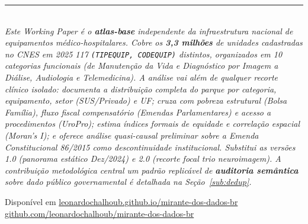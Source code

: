 \documentclass[12pt,a4paper,oneside]{article}
\begin{document}
\begin{titlepage}
\begin{center}
    \rule{0.6\linewidth}{0.4pt}\\[6pt]
    {\small\textit{Este Working Paper é o \textbf{atlas-base}
     independente da infraestrutura nacional de equipamentos
     médico-hospitalares. Cobre os \textbf{3,3 milhões} de unidades
     cadastradas no CNES em 2025
     \textemdash{} 117 \texttt{(TIPEQUIP, CODEQUIP)} distintos,
     organizados em 10 categorias funcionais (de Manutenção da Vida e
     Diagnóstico por Imagem a Diálise, Audiologia e Telemedicina). A
     análise vai além de qualquer recorte clínico isolado: documenta
     a distribuição completa do parque por categoria, equipamento,
     setor (SUS/Privado) e UF; cruza com pobreza estrutural (Bolsa
     Família), fluxo fiscal compensatório (Emendas Parlamentares) e
     acesso a procedimentos (UroPro); estima índices formais de
     equidade e correlação espacial (Moran's I); e oferece análise
     quasi-causal preliminar sobre a Emenda Constitucional 86/2015 como
     descontinuidade institucional. Substitui as versões 1.0 (panorama
     estático Dez/2024) e 2.0 (recorte focal trio neuroimagem). A
     contribuição metodológica central \textemdash{} um padrão
     replicável de \textbf{auditoria semântica} sobre dado público
     governamental \textemdash{} é detalhada na Seção~\ref{sub:dedup}.}}

    \vspace{1cm}
    {\footnotesize
     Disponível em
     \href{https://leonardochalhoub.github.io/mirante-dos-dados-br/}%
     {leonardochalhoub.github.io/mirante-dos-dados-br}}\\[2pt]
    {\footnotesize
     \href{https://github.com/leonardochalhoub/mirante-dos-dados-br}%
     {github.com/leonardochalhoub/mirante-dos-dados-br}}
  \end{center}
\end{titlepage}

\end{document}
